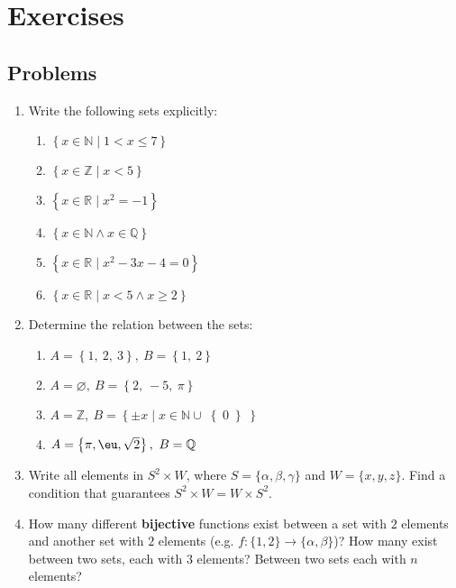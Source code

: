 \section{Exercises}
\subsection{Problems}
\begin{enumerate}
  \item Write the following sets explicitly:
    \begin{enumerate}[label=(\roman*)]
      \item $\left\{ x\in \mathbb{N}\mid1<x\leq7\right\}$
      \item $\left\{ x\in \mathbb{Z}\mid x<5\right\}$
      \item $\left\{ x\in \mathbb{R}\mid x^{2}=-1 \right\}$
      \item $\left\{ x\in \mathbb{N}\wedge x\in \mathbb{Q} \right\}$
      \item $\left\{ x\in \mathbb{R}\mid x^{2}-3x-4=0 \right\}$
      \item $\left\{ x\in\mathbb{R}\mid x<5\wedge x \geq 2\right\}$
    \end{enumerate}
  
	\item Determine the relation between the sets:
    \begin{enumerate}[label=(\roman*)]
      \item $A=\left\{ 1,\ 2,\ 3\right\},\ B=\left\{ 1,\ 2 \right\}$
      \item $A=\varnothing,\ B=\left\{ 2,\ -5,\ \pi \right\}$
      \item $A=\mathbb{Z},\ B=\left\{ \pm x \mid x\in\mathbb{N} \cup \right\{0\left\} \right\}$
			\item $A=\left\{\pi, \eu, \sqrt{2}\right\},\ B=\mathbb{Q}$
    \end{enumerate}

	\item Write all elements in $S^{2}\times W$, where $S=\{\alpha,\beta,\gamma\}$ and $W=\{x,y,z\}$. Find a condition that guarantees $S^{2}\times W = W\times S^{2}$.

	\item How many different \textbf{bijective} functions exist between a set with $2$ elements and another set with $2$ elements (e.g. $f:\{1,2\}\to\{\alpha,\beta\}$)? How many exist between two sets, each with $3$ elements? Between two sets each with $n$ elements?


\end{enumerate}
